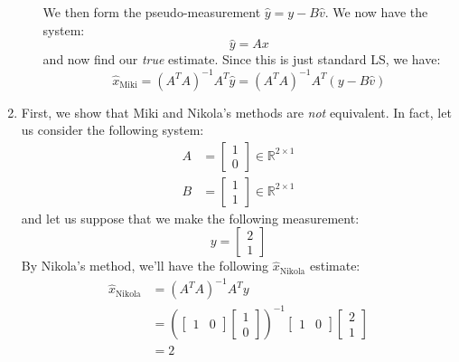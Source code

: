 \documentclass[12pt]{exam}
\begin{document}
\begin{questions}
\begin{solution}
\begin{enumerate}[label=(\alph*)]
\begin{itemize}
          We then form the pseudo-measurement $\hat{y} = y - B\hat{v}$. We now have the system:
          \[
            \hat{y} = Ax
          \]
          and now find our \textit{true} estimate. Since this is just standard LS, we have:
          \[
            \hat{x}_{\text{Miki}} = (A^TA)^{-1}A^T\hat{y} = (A^TA)^{-1}A^T(y - B\hat{v})
          \]
        \end{itemize}
      \item First, we show that Miki and Nikola's methods are \textit{not} equivalent. In fact, let us consider the following system:
      \begin{align*}
        A &= \begin{bmatrix}
          1 \\
          0
        \end{bmatrix} \in \mathbb{R}^{2 \times 1} \\
        B &=
          \begin{bmatrix}
            1 \\
            1
          \end{bmatrix} \in \mathbb{R}^{2 \times 1}
      \end{align*}
      and let us suppose that we make the following measurement:
      \[
        y =
          \begin{bmatrix}
            2 \\
            1
          \end{bmatrix}
      \]
      By Nikola's method, we'll have the following $\hat{x}_{\text{Nikola}}$ estimate:
      \begin{align*}
        \hat{x}_{\text{Nikola}} &= (A^TA)^{-1}A^Ty \\
        &=
          \left(\begin{bmatrix}
            1 & 0
          \end{bmatrix}
          \begin{bmatrix}
            1 \\
            0
          \end{bmatrix}\right)^{-1}
          \begin{bmatrix}
            1 & 0
          \end{bmatrix}
          \begin{bmatrix}
            2 \\
            1
          \end{bmatrix} \\
          &= 2
      \end{align*}

\end{enumerate}
\end{solution}
\end{questions}
\end{document}
